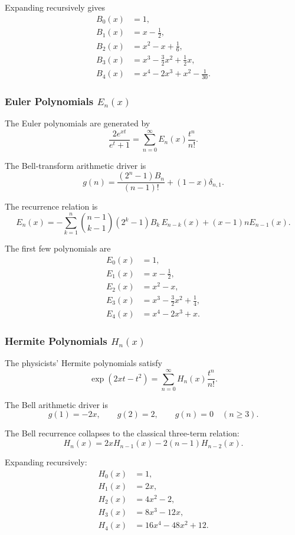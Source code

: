 \documentclass[11pt, a4paper]{article}
\theoremstyle{remark}
\begin{document}
Expanding recursively gives
\[
\begin{aligned}
B_0(x)&=1,\\
B_1(x)&=x-\frac12,\\
B_2(x)&=x^2-x+\frac16,\\
B_3(x)&=x^3-\frac32x^2+\frac12x,\\
B_4(x)&=x^4-2x^3+x^2-\frac1{30}.
\end{aligned}
\]

\subsubsection{Euler Polynomials \(E_n(x)\)}

The Euler polynomials are generated by
\[
\frac{2e^{xt}}{e^t+1}
=
\sum_{n=0}^{\infty}
E_n(x)\frac{t^n}{n!}.
\]

The Bell-transform arithmetic driver is
\[
g(n)
=
\frac{(2^n-1)B_n}{(n-1)!}
+
(1-x)\delta_{n,1}.
\]

The recurrence relation is
\[
\boxed{
E_n(x)
=
-\sum_{k=1}^n
\binom{n-1}{k-1}
(2^k-1)B_k\,E_{n-k}(x)
+
(x-1)nE_{n-1}(x).
}
\]

The first few polynomials are
\[
\begin{aligned}
E_0(x)&=1,\\
E_1(x)&=x-\frac12,\\
E_2(x)&=x^2-x,\\
E_3(x)&=x^3-\frac32x^2+\frac14,\\
E_4(x)&=x^4-2x^3+x.
\end{aligned}
\]

\subsubsection{Hermite Polynomials \(H_n(x)\)}

The physicists' Hermite polynomials satisfy
\[
\exp(2xt-t^2)
=
\sum_{n=0}^{\infty}
H_n(x)\frac{t^n}{n!}.
\]

The Bell arithmetic driver is
\[
g(1)=-2x,
\qquad
g(2)=2,
\qquad
g(n)=0
\quad(n\ge3).
\]

The Bell recurrence collapses to the classical three-term relation:
\[
\boxed{
H_n(x)
=
2xH_{n-1}(x)
-
2(n-1)H_{n-2}(x).
}
\]

Expanding recursively:
\[
\begin{aligned}
H_0(x)&=1,\\
H_1(x)&=2x,\\
H_2(x)&=4x^2-2,\\
H_3(x)&=8x^3-12x,\\
H_4(x)&=16x^4-48x^2+12.
\end{aligned}
\]
\end{document}
